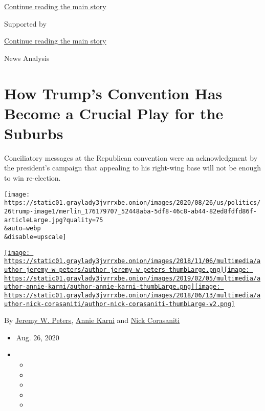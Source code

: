 \protect\hyperlink{after-top}{Continue reading the main story}

Supported by

\protect\hyperlink{after-sponsor}{Continue reading the main story}

News Analysis

\hypertarget{how-trumps-convention-has-become-a-crucial-play-for-the-suburbs}{%
\section{How Trump's Convention Has Become a Crucial Play for the
Suburbs}\label{how-trumps-convention-has-become-a-crucial-play-for-the-suburbs}}

Conciliatory messages at the Republican convention were an
acknowledgment by the president's campaign that appealing to his
right-wing base will not be enough to win re-election.

\texttt{[image: https://static01.graylady3jvrrxbe.onion/images/2020/08/26/us/politics/26trump-image1/merlin\_176179707\_52448aba-5df8-46c8-ab44-82ed8fdfd86f-articleLarge.jpg?quality=75\\\&auto=webp\\\&disable=upscale]}

\href{https://www.nytimes3xbfgragh.onion/by/jeremy-w-peters}{\texttt{[image: https://static01.graylady3jvrrxbe.onion/images/2018/11/06/multimedia/author-jeremy-w-peters/author-jeremy-w-peters-thumbLarge.png]}}\href{https://www.nytimes3xbfgragh.onion/by/annie-karni}{\texttt{[image: https://static01.graylady3jvrrxbe.onion/images/2019/02/05/multimedia/author-annie-karni/author-annie-karni-thumbLarge.png]}}\href{https://www.nytimes3xbfgragh.onion/by/nick-corasaniti}{\texttt{[image: https://static01.graylady3jvrrxbe.onion/images/2018/06/13/multimedia/author-nick-corasaniti/author-nick-corasaniti-thumbLarge-v2.png]}}

By \href{https://www.nytimes3xbfgragh.onion/by/jeremy-w-peters}{Jeremy
W. Peters},
\href{https://www.nytimes3xbfgragh.onion/by/annie-karni}{Annie Karni}
and \href{https://www.nytimes3xbfgragh.onion/by/nick-corasaniti}{Nick
Corasaniti}

\begin{itemize}
\item
  Aug. 26, 2020
\item
  \begin{itemize}
  \item
  \item
  \item
  \item
  \item
  \end{itemize}
\end{itemize}

